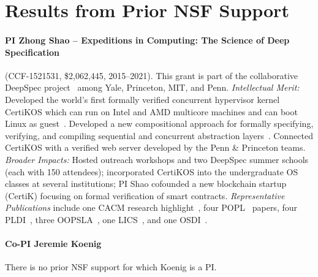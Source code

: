 \section{Results from Prior NSF Support}
\label{sec:prior}

\paragraph{PI Zhong Shao -- Expeditions in Computing: The Science of Deep Specification} (CCF-1521531, \$2,062,445, 2015--2021). 
This grant is part of the collaborative DeepSpec project~\cite{deepspec} among Yale, Princeton, MIT, and Penn. 
\emph{Intellectual Merit:} 
Developed the world's first formally verified
concurrent hypervisor kernel CertiKOS which can run on Intel and AMD
multicore machines and can boot Linux as guest~\cite{certikos-osdi16}. Developed a
new compositional approach for formally specifying, verifying, and
compiling sequential and concurrent abstraction
layers~\cite{chen16,costanzo16,certikos-osdi16,ccal18,compcerto,wang2019,koenig20}.
Connected CertiKOS with a verified web server
developed by the Penn \& Princeton teams.
\emph{Broader Impacts:} 
Hosted outreach workshops and two DeepSpec summer schools (each with
150 attendees); incorporated CertiKOS into the undergraduate OS
classes at several institutions; PI Shao cofounded a new blockchain startup
(CertiK) focusing on formal verification of smart contracts.
{\em Representative Publications} include one
CACM research highlight~\cite{certikos-cacm19}, four
POPL~\cite{wang2019,liu-popl20,wang2022,layered22} papers, four
PLDI~\cite{chen16,costanzo16,ccal18,compcerto}, three
OOPSLA~\cite{deepsea19,compcertelf20,ado21}, one LICS~\cite{koenig20},
and one OSDI~\cite{certikos-osdi16}.

\vspace*{-2ex}
\paragraph{Co-PI Jeremie Koenig} 
There is no prior NSF support for which Koenig is a PI.

